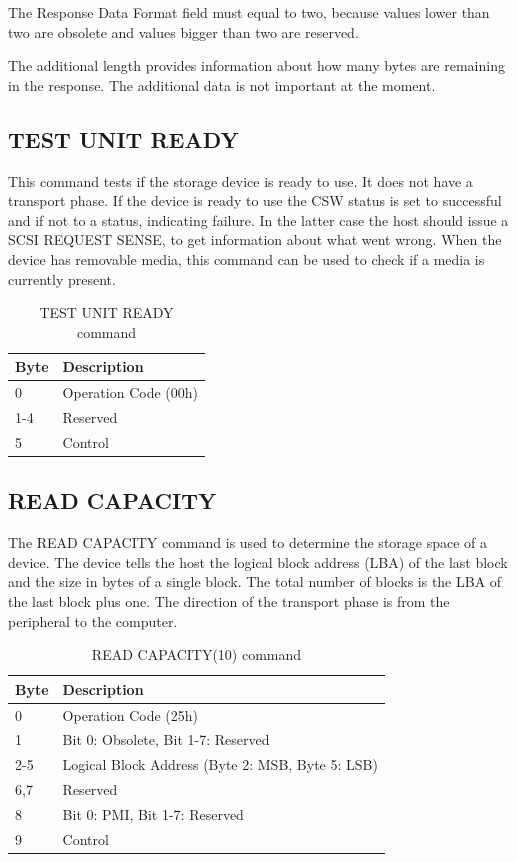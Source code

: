 The Response Data Format field must equal to two, because values lower than two are obsolete and values bigger than two are reserved\cite{scsi_seagate}.

The additional length provides information about how many bytes are remaining in the response. The additional data is not important at the moment.

\subsection{TEST UNIT READY}

This command tests if the storage device is ready to use. It does not have a transport phase. If the device is ready to use the CSW status is set to successful and if not to a status, indicating failure. In the latter case the host should issue a SCSI REQUEST SENSE, to get information about what went wrong. When the device has removable media, this command can be used to check if a media is currently present\cite{usb_ms_jan}.

\begin{table}[ht]
\caption{TEST UNIT READY command \cite{scsi_seagate}}
\centering
\begin{tabular}{|l|l|}
\hline\hline
\textbf{Byte} & \textbf{Description}\\ \hline
0 & Operation Code (00h)\\ \hline
1-4 & Reserved \\ \hline
5 & Control \\ \hline
\end{tabular}
\label{table:unit_ready}
\end{table}

\newpage

\subsection{READ CAPACITY}

The READ CAPACITY command is used to determine the storage space of a device. The device tells the host the logical block address (LBA) of the last block and the size in bytes of a single block. The total number of blocks is the LBA of the last block plus one. The direction of the transport phase is from the peripheral to the computer.

\begin{table}[ht]
\caption{READ CAPACITY(10) command \cite{scsi_seagate}}
\centering
\begin{tabular}{|l|l|}
\hline\hline
\textbf{Byte} & \textbf{Description}\\ \hline
0 & Operation Code (25h)\\ \hline
1 & Bit 0: Obsolete, Bit 1-7: Reserved \\ \hline
2-5 & Logical Block Address (Byte 2: MSB, Byte 5: LSB) \\ \hline
6,7 & Reserved \\ \hline
8 & Bit 0: PMI, Bit 1-7: Reserved \\ \hline
9 & Control \\ \hline
\end{tabular}
\label{table:read_capacity}
\end{table}

